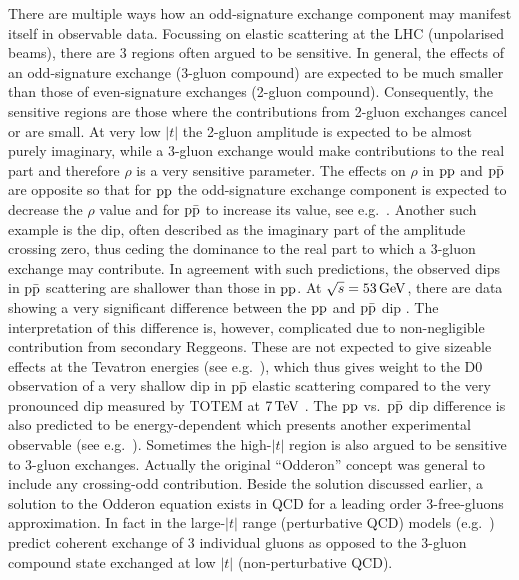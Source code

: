 There are multiple ways how an odd-signature exchange component may manifest itself in observable data. Focussing on elastic scattering at the LHC (unpolarised beams), there are 3 regions often argued to be sensitive. In general, the effects of an odd-signature exchange (3-gluon compound) are expected to be much smaller than those of even-signature exchanges (2-gluon compound). Consequently, the sensitive regions are those where the contributions from 2-gluon exchanges cancel or are small. At very low $|t|$ the 2-gluon amplitude is expected to be almost purely imaginary, while a 3-gluon exchange would make contributions to the real part and therefore $\rho$ is a very sensitive parameter. The effects on $\rho$ in $\rm pp$ and $\rm p\bar p$ are opposite so that for $\rm pp$ the odd-signature exchange component is expected to decrease the $\rho$ value and for $\rm p\bar p$ to increase its value, see e.g.~\cite{nicolescu-2007}. Another such example is the dip, often described as the imaginary part of the amplitude crossing zero, thus ceding the dominance to the real part to which a 3-gluon exchange may contribute. In agreement with such predictions, the observed dips in $\rm p\bar p$ scattering are shallower than those in $\rm pp$. At $\sqrt s = 53\,{\rm GeV}$, there are data showing a very significant difference between the $\rm pp$ and $\rm p\bar p$ dip \cite{breakstone-85}. The interpretation of this difference is, however, complicated due to non-negligible contribution from secondary Reggeons. These are not expected to give sizeable effects at the Tevatron energies (see e.g.~\cite{broniowski-2018}), which thus gives weight to the D0 observation of a very shallow dip in $\rm p\bar p$ elastic scattering \cite{d0-elastic} compared to the very pronounced dip measured by TOTEM at $7\,{\rm TeV}$ \cite{totem-7tev-first}. The $\rm pp$ vs.~$\rm p\bar p$ dip difference is also predicted to be energy-dependent which presents another experimental observable (see e.g.~\cite{ster-2015}). Sometimes the high-$|t|$ region is also argued to be sensitive to 3-gluon exchanges. Actually the original ``Odderon'' concept was general to include any crossing-odd contribution. Beside the solution discussed earlier, a solution to the Odderon equation exists in QCD for a leading order 3-free-gluons approximation. In fact in the large-$|t|$ range (perturbative QCD) models (e.g.~\cite{Donnachie:1979yu}) predict coherent exchange of 3 individual gluons as opposed to the 3-gluon compound state exchanged at low $|t|$ (non-perturbative QCD).

